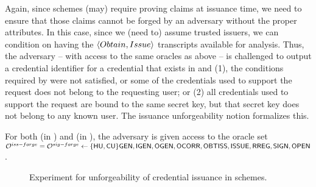 Again, since \UAS schemes (may) require proving claims at issuance time, we
need to ensure that those claims cannot be forged by an adversary without the
proper attributes. In this case, since we (need to) assume trusted issuers, we
can condition on having the $\langle Obtain,Issue \rangle$ transcripts
available for analysis. Thus, the adversary -- with access to the same oracles
as above -- is challenged to output a credential identifier for a credential
that exists in \CRED and (1), the conditions required by \fissue were not
satisfied, or some of the credentials used to support the request does not
belong to the requesting user; or (2) all credentials used to support the
request are bound to the same secret key, but that secret key does not belong
to any known user. The issuance unforgeability notion formalizes this.

For both \ExpForgeIssue (in ) and \ExpForgeSign
(in ), the adversary is given access to the
oracle set $\mathcal{O}^{iss-forge} = \mathcal{O}^{sig-forge} \gets \lbrace\mathsf{HU},\mathsf{CU}\rbrace\mathsf{GEN},\mathsf{IGEN},
\mathsf{OGEN},\mathsf{OCORR},\mathsf{OBTISS},\mathsf{ISSUE},\mathsf{RREG},\mathsf{SIGN},\mathsf{OPEN}$.

\begin{figure}[htp!]
  \caption{Experiment for unforgeability of credential issuance in \UAS schemes.}
  \label{fig:exp-uas-unfor-issue}
\end{figure}    


